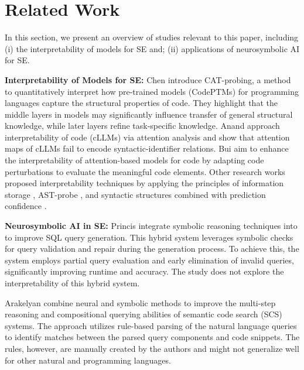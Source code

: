 \section{Related Work}
\label{sec:related_work}



In this section, we present an overview of studies relevant to this paper, including (i) the interpretability of models for SE and; (ii) applications of neurosymbolic AI for SE. 


\textbf{Interpretability of Models for SE:} Chen \etal \cite{chen_cat-probing_2022} introduce CAT-probing, a method to quantitatively interpret how pre-trained models (CodePTMs) for programming languages capture the structural properties of code. They highlight that the middle layers in models may significantly influence transfer of general structural knowledge, while later layers refine task-specific knowledge. Anand \etal \cite{anand_critical_2024} approach interpretability of code \llms (cLLMs) via attention analysis and show that attention maps of cLLMs fail to encode syntactic-identifier relations. Bui \etal \cite{bui_autofocus_2019} aim to enhance the interpretability of attention-based models for code by adapting code perturbations to evaluate the meaningful code elements. Other research works proposed interpretability techniques by applying the principles of information storage \cite{haider_looking_2024},  AST-probe \cite{majdinasab_deepcodeprobe_2024}, and syntactic structures combined with prediction confidence \cite{palacio_towards_2024}.

\textbf{Neurosymbolic AI in SE:} Princis \etal \cite{princis_sql_2024} integrate symbolic reasoning techniques into \llms to improve SQL query generation. This hybrid system leverages symbolic checks for query validation and repair during the generation process. To achieve this, the system employs partial query evaluation and early elimination of invalid queries, significantly improving runtime and accuracy. The study does not explore the interpretability of this hybrid system. 

Arakelyan \etal \cite{arakelyan_ns3_2022} combine neural and symbolic methods to improve the multi-step reasoning and compositional querying abilities of semantic code search (SCS) systems. The approach utilizes rule-based parsing of the natural language queries to identify matches between the parsed query components and code snippets. The rules, however, are manually created by the authors and might not generalize well for other natural and programming languages.

